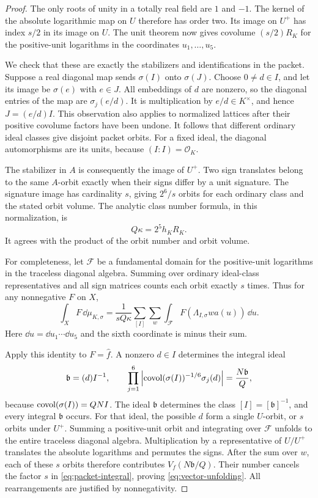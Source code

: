\begin{proof}
The only roots of unity in a totally real field are $1$ and $-1$.
The kernel of the absolute logarithmic map on $U$ therefore has
order two.  Its image on $U^+$ has index $s/2$ in its image on $U$.
The unit theorem now gives covolume $(s/2)R_K$ for the positive-unit
logarithms in the coordinates $u_1,\ldots,u_5$.

We check that these are exactly the stabilizers and identifications
in the packet.  Suppose a real diagonal map sends $\sigma(I)$ onto
$\sigma(J)$.  Choose $0\ne d\in I$, and let its image be $\sigma(e)$
with $e\in J$.  All embeddings of $d$ are nonzero, so the diagonal
entries of the map are $\sigma_j(e/d)$.  It is multiplication by
$e/d\in K^\times$, and hence $J=(e/d)I$.  This observation also
applies to normalized lattices after their positive covolume factors
have been undone.  It follows that different ordinary ideal classes
give disjoint packet orbits.  For a fixed ideal, the diagonal
automorphisms are its units, because $(I:I)=\mathcal O_K$.

The stabilizer in $A$ is consequently the image of $U^+$.
Two sign translates belong to the same $A$-orbit exactly when their
signs differ by a unit signature.  The signature image has cardinality
$s$, giving $2^6/s$ orbits for each ordinary class and the stated orbit
volume.  The analytic class number formula, in this normalization, is
\[
 Q\kappa=2^5h_KR_K.
\]
It agrees with the product of the orbit number and orbit volume.

For completeness, let $\mathcal F$ be a fundamental domain for the
positive-unit logarithms in the traceless diagonal algebra.  Summing
over ordinary ideal-class representatives and all sign matrices
counts each orbit exactly $s$ times.  Thus for any nonnegative $F$ on
$X$,
\begin{equation}
 \int_XF\,\dd\mu_{K,\sigma}
 =\frac1{sQ\kappa}\sum_{[I]}\sum_w
   \int_{\mathcal F}F(\Lambda_{I,\sigma}w a(u))\,\dd u.
                                                        \label{eq:packet-integral}
\end{equation}
Here $\dd u=\dd u_1\cdots\dd u_5$ and the sixth coordinate is minus
their sum.

Apply this identity to $F=\widehat f$.  A nonzero $d\in I$ determines
the integral ideal
\[
 \mathfrak b=(d)I^{-1},
 \qquad
 \prod_{j=1}^6
 \left|\operatorname{covol}(\sigma(I))^{-1/6}\sigma_j(d)\right|
 =\frac{N\mathfrak b}{Q},
\]
because $\operatorname{covol}(\sigma(I))=QNI$.  The ideal $\mathfrak b$
determines the class $[I]=[\mathfrak b]^{-1}$, and every integral
$\mathfrak b$ occurs.  For that ideal, the possible $d$ form a single
$U$-orbit, or $s$ orbits under $U^+$.  Summing a positive-unit orbit
and integrating over $\mathcal F$ unfolds to the entire traceless
diagonal algebra.  Multiplication by a representative of $U/U^+$
translates the absolute logarithms and permutes the signs.  After the
sum over $w$, each of these $s$ orbits therefore contributes
$V_f(N\mathfrak b/Q)$.  Their number cancels the factor $s$ in
\eqref{eq:packet-integral}, proving \eqref{eq:vector-unfolding}.
All rearrangements are justified by nonnegativity.
\end{proof}

